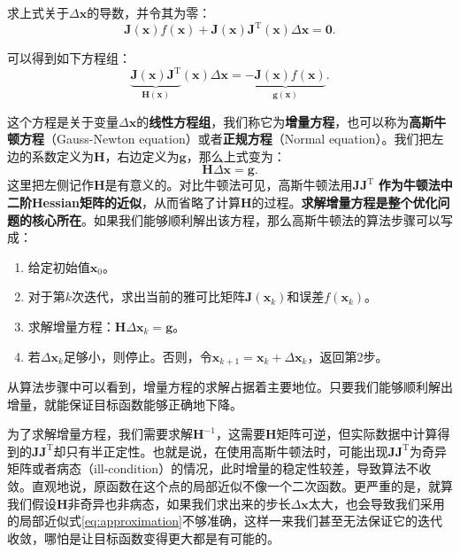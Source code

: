 求上式关于$\Delta \bm{x}$的导数，并令其为零：
\begin{displaymath}
\bm{J} {\left( \bm{x} \right)}f\left( \bm{x} \right) + \bm{J} {\left( \bm{x} \right)} \bm{J}^\mathrm{T} \left( \bm{x} \right)\Delta \bm{x} = \bm{0}.
\end{displaymath}

可以得到如下方程组：
\begin{equation}
\underbrace{\bm{J} {\left( \bm{x} \right)} \bm{J}^\mathrm{T}}_{\bm{H}(\bm{x})} \left( \bm{x} \right)\Delta \bm{x} =  \underbrace{- \bm{J} {\left( \bm{x} \right)} f\left( \bm{x} \right)}_{\bm{g}(\bm{x})}.
\end{equation}

这个方程是关于变量$\Delta \bm{x}$的\textbf{线性方程组}，我们称它为\textbf{增量方程}，也可以称为\textbf{高斯牛顿方程}（Gauss-Newton equation）或者\textbf{正规方程}（Normal equation）。我们把左边的系数定义为$\bm{H}$，右边定义为$\bm{g}$，那么上式变为：
\begin{equation}
\label{eq:minimize-deltax}
\bm{H} \Delta \bm{x} = \bm{g}.
\end{equation}
这里把左侧记作$\bm{H}$是有意义的。对比牛顿法可见，高斯牛顿法用$\bm{J}\bm{J}^\mathrm{T}$ \textbf{作为牛顿法中二阶Hessian矩阵的近似}，从而省略了计算$\bm{H}$的过程。\textbf{求解增量方程是整个优化问题的核心所在}。如果我们能够顺利解出该方程，那么高斯牛顿法的算法步骤可以写成：

\begin{mdframed}
	\begin{enumerate}
		\item 给定初始值$\bm{x}_0$。
		\item 对于第$k$次迭代，求出当前的雅可比矩阵$\bm{J}(\bm{x}_k)$和误差$f(\bm{x}_k)$。
		\item 求解增量方程：$\bm{H} \Delta \bm{x}_k = \bm{g}$。
		\item 若$\Delta \bm{x}_k$足够小，则停止。否则，令$\bm{x}_{k+1} = \bm{x}_k+\Delta \bm{x}_k$，返回第2步。
	\end{enumerate}
\end{mdframed}

从算法步骤中可以看到，增量方程的求解占据着主要地位。只要我们能够顺利解出增量，就能保证目标函数能够正确地下降。

为了求解增量方程，我们需要求解$\bm{H}^{-1}$，这需要$\bm{H}$矩阵可逆，但实际数据中计算得到的$\bm{J} \bm{J}^\mathrm{T}$却只有半正定性。也就是说，在使用高斯牛顿法时，可能出现$\bm{J}\bm{J}^\mathrm{T}$为奇异矩阵或者病态（ill-condition）的情况，此时增量的稳定性较差，导致算法不收敛。直观地说，原函数在这个点的局部近似不像一个二次函数。更严重的是，就算我们假设$\bm{H}$非奇异也非病态，如果我们求出来的步长$\Delta \bm{x}$太大，也会导致我们采用的局部近似式\eqref{eq:approximation}不够准确，这样一来我们甚至无法保证它的迭代收敛，哪怕是让目标函数变得更大都是有可能的。

